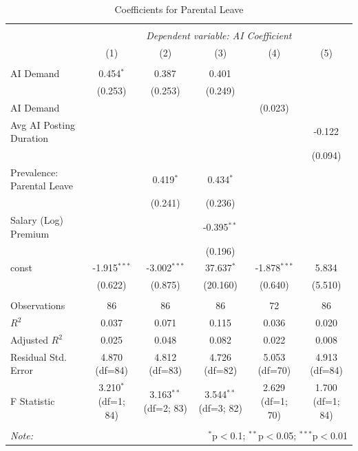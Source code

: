 \begin{table}[!htbp] \centering
  \caption{Coefficients for Parental Leave}
\begin{tabular}{@{\extracolsep{5pt}}lccccc}
\\[-1.8ex]\hline
\hline \\[-1.8ex]
& \multicolumn{5}{c}{\textit{Dependent variable: AI Coefficient}} \
\cr \cline{2-6}
\\[-1.8ex] & (1) & (2) & (3) & (4) & (5) \\
\hline \\[-1.8ex]
 AI Demand & 0.454$^{*}$ & 0.387$^{}$ & 0.401$^{}$ & & \\
& (0.253) & (0.253) & (0.249) & & \\
 AI Demand %
& & & & (0.023) & \\
 Avg AI Posting Duration & & & & & -0.122$^{}$ \\
& & & & & (0.094) \\
 Prevalence: Parental Leave & & 0.419$^{*}$ & 0.434$^{*}$ & & \\
& & (0.241) & (0.236) & & \\
 Salary (Log) Premium & & & -0.395$^{**}$ & & \\
& & & (0.196) & & \\
 const & -1.915$^{***}$ & -3.002$^{***}$ & 37.637$^{*}$ & -1.878$^{***}$ & 5.834$^{}$ \\
& (0.622) & (0.875) & (20.160) & (0.640) & (5.510) \\
\hline \\[-1.8ex]
 Observations & 86 & 86 & 86 & 72 & 86 \\
 $R^2$ & 0.037 & 0.071 & 0.115 & 0.036 & 0.020 \\
 Adjusted $R^2$ & 0.025 & 0.048 & 0.082 & 0.022 & 0.008 \\
 Residual Std. Error & 4.870 (df=84) & 4.812 (df=83) & 4.726 (df=82) & 5.053 (df=70) & 4.913 (df=84) \\
 F Statistic & 3.210$^{*}$ (df=1; 84) & 3.163$^{**}$ (df=2; 83) & 3.544$^{**}$ (df=3; 82) & 2.629$^{}$ (df=1; 70) & 1.700$^{}$ (df=1; 84) \\
\hline
\hline \\[-1.8ex]
\textit{Note:} & \multicolumn{5}{r}{$^{*}$p$<$0.1; $^{**}$p$<$0.05; $^{***}$p$<$0.01} \\
\end{tabular}
\end{table}